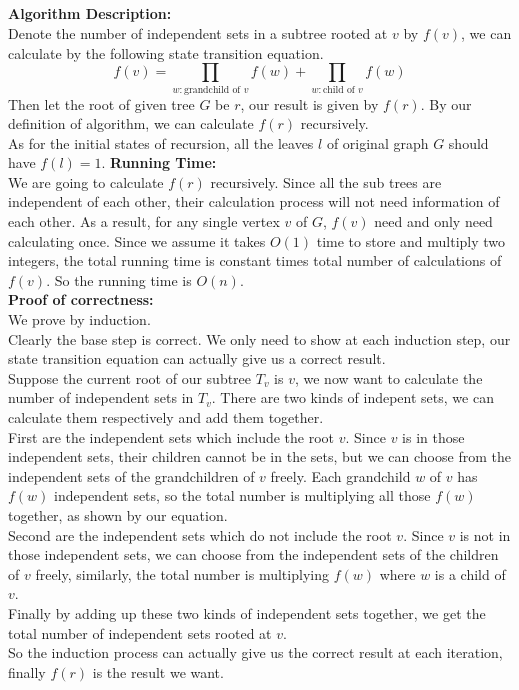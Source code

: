 \documentclass[12pt,letterpaper]{article}
\begin{document}
\subsection{}
\textbf{Algorithm Description:}\\
Denote the number of independent sets in a subtree rooted at $v$ by $f(v)$,
we can calculate by the following state transition equation.\\
$$f(v)=\prod_{w: \text{grandchild of } v}f(w)+\prod_{w: \text{child of }v}f(w)$$
Then let the root of given tree $G$ be $r$, our result is given by $f(r)$.
By our definition of algorithm, we can calculate $f(r)$ recursively.\\
As for the initial states of recursion,
all the leaves $l$ of original graph $G$ should have $f(l)=1$.
\textbf{Running Time:}\\
We are going to calculate $f(r)$ recursively.
Since all the sub trees are independent of each other,
their calculation process will not need information of each other.
As a result, for any single vertex $v$ of $G$,
$f(v)$ need and only need calculating once. 
Since we assume it takes $O(1)$ time to store and multiply two integers,
the total running time is constant times total number of calculations of $f(v)$.
So the running time is $O(n)$.\\
\textbf{Proof of correctness:}\\
We prove by induction.\\
Clearly the base step is correct.
We only need to show at each induction step,
our state transition equation can actually give us a correct result.\\
Suppose the current root of our subtree $T_v$ is $v$,
we now want to calculate the number of independent sets in $T_v$.
There are two kinds of indepent sets, 
we can calculate them respectively and add them together.\\
First are the independent sets which include the root $v$.
Since $v$ is in those independent sets, 
their children cannot be in the sets,
but we can choose from the independent sets of the grandchildren of $v$ freely.
Each grandchild $w$ of $v$ has $f(w)$ independent sets,
so the total number is multiplying all those $f(w)$ together,
as shown by our equation.\\
Second are the independent sets which do not include the root $v$.
Since $v$ is not in those independent sets,  
we can choose from the independent sets of the children of $v$ freely,
similarly, the total number is multiplying $f(w)$ where $w$ is a child of $v$.\\
Finally by adding up these two kinds of independent sets together,
we get the total number of independent sets rooted at $v$.\\
So the induction process can actually give us the correct result at each iteration,
finally $f(r)$ is the result we want.
\end{document}
